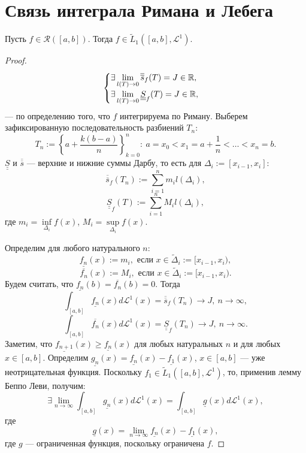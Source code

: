 \section{Связь интеграла Римана и Лебега}
\begin{theorem}
    Пусть $f \in \mathcal{R}([a,b])$.
    Тогда $f \in \widetilde{L}_1([a,b], \mathcal{L}^1)$.
\end{theorem} 
\begin{proof}
    \[
    \begin{cases}
        \exists \lim\limits_{l(T) \to 0} \overline{\overline{s}}_f(T) = J \in \mathbb{R}, \\
        \exists \lim\limits_{l(T) \to 0} \underline{\underline{S}}_f(T) = J \in \mathbb{R},
    \end{cases}
    \]
    — по определению того, что $f$ интегрируема по Риману.
    Выберем зафиксированную последовательность разбиений $T_n$:
    \[T_n := \left\{a + \frac{k(b-a)}{n}\right\}_{k=0}^n: \
    a = x_0 < x_1 = a + \frac{1}{n} < \dots < x_n = b.\]
    $\underline{\underline{S}}$ и $\overline{\overline{s}}$ — верхние и нижние суммы Дарбу, то есть для $\Delta_i := [x_{i-1}, x_i]$:
    \[\overline{\overline{s}}_f(T_n) := \sum\limits_{i=1}^{n}m_i l(\Delta_i),\]
    \[\underline{\underline{S}}_f(T) := \sum\limits_{i=1}^{n}M_i l(\Delta_i),\]
    где $m_i = \inf\limits_{\Delta_i}f(x)$, $M_i = \sup\limits_{\Delta_i}f(x)$.

    Определим для любого натурального $n$:
    \[\underline{f_n}(x) := m_i, \text{ если } x \in \widetilde{\Delta}_i := [x_{i-1}, x_i),\]
    \[\overline{f_n}(x) := M_i, \text{ если } x \in \widetilde{\Delta}_i := [x_{i-1}, x_i).\]
    Будем считать, что $\underline{f_n}(b) = \overline{f_n}(b) = 0$.
    Тогда
    \[\int_{[a,b]} \underline{f_n}(x) d \mathcal{L}^1(x) = \overline{\overline{s}}_f(T_n) \to J, \ n \to \infty,\]
    \[\int_{[a,b]} \overline{f_n}(x) d \mathcal{L}^1(x) = \underline{\underline{S}}_f(T_n) \to J, \ n \to \infty.\]
    Заметим, что $\underline{f_{n+1}}(x) \geqslant \underline{f_n}(x)$ для любых натуральных $n$ и для любых $x \in [a,b]$.
    Определим
    $\underline{g_n}(x) = \underline{f_n}(x) - \underline{f_1}(x)$, $x \in [a,b]$ — уже неотрицательная функция.
    Поскольку $f_1 \in \widetilde{L}_1([a,b], \mathcal{L}^1)$, то, применив лемму Беппо Леви, получим:
    \[\exists \lim\limits_{n\to \infty} \int_{[a,b]} \underline{g_n}(x) d \mathcal{L}^1(x) = \int_{[a,b]} \underline{g}(x) d \mathcal{L}^1(x),\]
    где
    \[\underline{g}(x) = \lim\limits_{n\to \infty} \underline{f_n}(x) - \underline{f_1}(x),\]
    где $g$ — ограниченная функция, поскольку ограничена $f$.


\end{proof}
